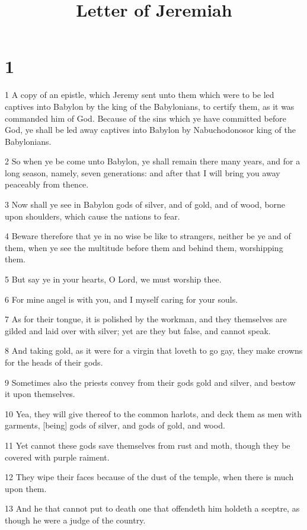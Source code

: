 

\title{Letter of Jeremiah}

\chapter{1}


\par 1 A copy of an epistle, which Jeremy sent unto them which were to be led captives into Babylon by the king of the Babylonians, to certify them, as it was commanded him of God. Because of the sins which ye have committed before God, ye shall be led away captives into Babylon by Nabuchodonosor king of the Babylonians.
\par 2 So when ye be come unto Babylon, ye shall remain there many years, and for a long season, namely, seven generations: and after that I will bring you away peaceably from thence.
\par 3 Now shall ye see in Babylon gods of silver, and of gold, and of wood, borne upon shoulders, which cause the nations to fear.
\par 4 Beware therefore that ye in no wise be like to strangers, neither be ye and of them, when ye see the multitude before them and behind them, worshipping them.
\par 5 But say ye in your hearts, O Lord, we must worship thee.
\par 6 For mine angel is with you, and I myself caring for your souls.
\par 7 As for their tongue, it is polished by the workman, and they themselves are gilded and laid over with silver; yet are they but false, and cannot speak.
\par 8 And taking gold, as it were for a virgin that loveth to go gay, they make crowns for the heads of their gods.
\par 9 Sometimes also the priests convey from their gods gold and silver, and bestow it upon themselves.
\par 10 Yea, they will give thereof to the common harlots, and deck them as men with garments, [being] gods of silver, and gods of gold, and wood.
\par 11 Yet cannot these gods save themselves from rust and moth, though they be covered with purple raiment.
\par 12 They wipe their faces because of the dust of the temple, when there is much upon them.
\par 13 And he that cannot put to death one that offendeth him holdeth a sceptre, as though he were a judge of the country.
